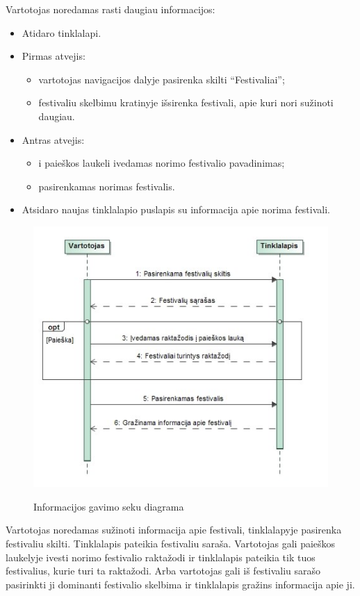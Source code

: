 ﻿\documentclass{VUMIFPSkursinis}
\begin{document}
Vartotojas noredamas rasti daugiau informacijos:
\begin{itemize}
\item Atidaro tinklalapi.
\item Pirmas atvejis:
\begin{itemize}
\item vartotojas navigacijos dalyje pasirenka skilti “Festivaliai”;
\item festivaliu skelbimu kratinyje išsirenka festivali, apie kuri nori sužinoti daugiau.
\end{itemize}
\item Antras atvejis:
\begin{itemize}
\item i paieškos laukeli ivedamas norimo festivalio pavadinimas;
\item pasirenkamas norimas festivalis.
\end{itemize}
\item Atsidaro naujas tinklalapio puslapis su informacija apie norima festivali.
\end{itemize}

\begin{figure}[H]
    \centering
    \includegraphics[scale=0.7]{img/geri/_klientasInfo}
    \label{img:uml4}
	\caption{Informacijos gavimo seku diagrama}
\end{figure}

Vartotojas noredamas sužinoti informacija apie festivali, tinklalapyje pasirenka festivaliu skilti. Tinklalapis pateikia festivaliu saraša. Vartotojas gali paieškos laukelyje ivesti norimo festivalio raktažodi ir tinklalapis pateikia tik tuos festivalius, kurie turi ta raktažodi. Arba vartotojas gali iš festivaliu sarašo pasirinkti ji dominanti festivalio skelbima ir tinklalapis gražins informacija apie ji.
\end{document}
